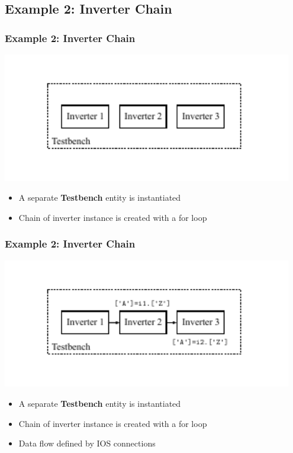 \documentclass{sdkslides}
\begin{document}

\renewcommand{\sectionname}{Example 2: Inverter Chain}
\subsection*{\sectionname}
\begin{frame}[t]
    \frametitle{\sectionname}
    \begin{center}
        \includegraphics[width=0.95\textwidth]{Pics/inverter_chain_0}
    \end{center}
    \begin{itemize}
        \item A separate \textbf{Testbench} entity is instantiated
        \item Chain of inverter instance is created with a for loop
    \end{itemize}
\end{frame}

\begin{frame}[t]
    \frametitle{\sectionname}
    \begin{center}
        \includegraphics[width=0.95\textwidth]{Pics/inverter_chain_2}
    \end{center}
    \begin{itemize}
        \item A separate \textbf{Testbench} entity is instantiated
        \item Chain of inverter instance is created with a for loop
        \item Data flow defined by IOS connections
    \end{itemize}
\end{frame}
\end{document}
